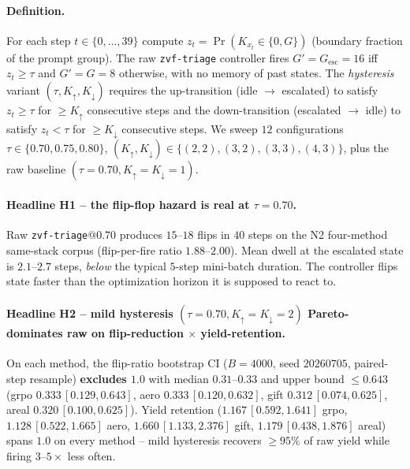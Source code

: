 \documentclass{article}
\begin{document}
\paragraph{Definition.}
For each step $t \in \{0,\dots,39\}$ compute
$z_t = \Pr(K_{x_t} \in \{0, G\})$ (boundary fraction of the prompt
group).  The raw \texttt{zvf-triage} controller fires
$G' = G_{\mathrm{esc}} = 16$ iff $z_t \ge \tau$ and $G' = G = 8$
otherwise, with no memory of past states.
The \emph{hysteresis} variant
$(\tau, K_{\uparrow}, K_{\downarrow})$ requires the up-transition
(idle $\to$ escalated) to satisfy $z_t \ge \tau$ for
$\ge K_{\uparrow}$ consecutive steps and the down-transition
(escalated $\to$ idle) to satisfy $z_t < \tau$ for
$\ge K_{\downarrow}$ consecutive steps.
We sweep $12$ configurations
$\tau \in \{0.70, 0.75, 0.80\}$,
$(K_{\uparrow}, K_{\downarrow}) \in \{(2,2), (3,2), (3,3), (4,3)\}$,
plus the raw baseline $(\tau{=}0.70, K_{\uparrow}{=}K_{\downarrow}{=}1)$.

\paragraph{Headline H1 -- the flip-flop hazard is real at
              $\tau = 0.70$.}
Raw \texttt{zvf-triage}@$0.70$ produces $15$--$18$ flips in $40$
steps on the N2 four-method same-stack corpus (flip-per-fire
ratio $1.88$--$2.00$).  Mean dwell at the escalated state is
$2.1$--$2.7$ steps, \emph{below} the typical $5$-step mini-batch
duration.  The controller flips state faster than the
optimization horizon it is supposed to react to.

\paragraph{Headline H2 -- mild hysteresis
              $(\tau{=}0.70, K_{\uparrow}{=}K_{\downarrow}{=}2)$
              Pareto-dominates raw on flip-reduction $\times$
              yield-retention.}
On each method, the flip-ratio bootstrap CI
($B = 4000$, seed $20260705$, paired-step resample)
\textbf{excludes $1.0$} with median $0.31$--$0.33$ and upper bound
$\le 0.643$ (grpo $0.333\,[0.129, 0.643]$, aero
$0.333\,[0.120, 0.632]$, gift $0.312\,[0.074, 0.625]$, areal
$0.320\,[0.100, 0.625]$).  Yield retention
($1.167\,[0.592,1.641]$ grpo, $1.128\,[0.522,1.665]$ aero,
$1.660\,[1.133,2.376]$ gift, $1.179\,[0.438,1.876]$ areal) spans
$1.0$ on every method -- mild hysteresis recovers
$\ge 95\%$ of raw yield while firing $3$--$5\times$ less often.
\end{document}
